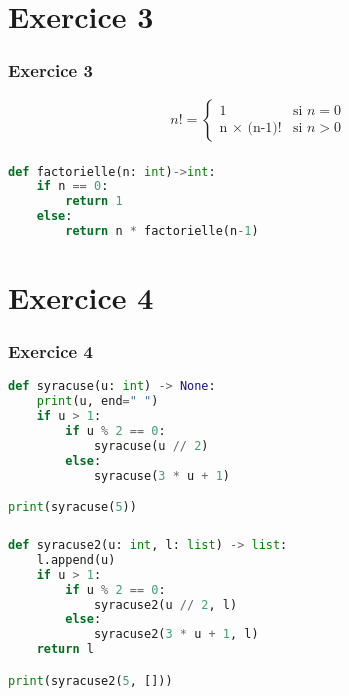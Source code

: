 \documentclass[svgnames,11pt]{beamer}
\begin{document}
\section{Exercice 3}
\begin{frame}
    \frametitle{Exercice 3}
    $$
    n! = \left\{
        \begin{array}{ll}
            1 & \mbox{si  }n=0\\
            \mbox{n × (n-1)!} & \mbox{si }n>0\
        \end{array}
    \right.
    $$
    

\end{frame}
\begin{frame}[fragile]
    \frametitle{}

\begin{center}
\begin{lstlisting}[language=Python , basicstyle=\ttfamily\small, xleftmargin=1em, xrightmargin=1em]
def factorielle(n: int)->int:
    if n == 0:
        return 1
    else:
        return n * factorielle(n-1)
\end{lstlisting}
\end{center}

\end{frame}
\section{Exercice 4}
\begin{frame}[fragile]
    \frametitle{Exercice 4}

\begin{center}
\begin{lstlisting}[language=Python , basicstyle=\ttfamily\small, xleftmargin=2em, xrightmargin=2em]
def syracuse(u: int) -> None:
    print(u, end=" ")
    if u > 1:
        if u % 2 == 0:
            syracuse(u // 2)
        else:
            syracuse(3 * u + 1)

print(syracuse(5))
\end{lstlisting}
\end{center}

\end{frame}
\begin{frame}[fragile]
    \frametitle{}

\begin{center}
\begin{lstlisting}[language=Python , basicstyle=\ttfamily\small, xleftmargin=2em, xrightmargin=2em]
def syracuse2(u: int, l: list) -> list:
    l.append(u)
    if u > 1:
        if u % 2 == 0:
            syracuse2(u // 2, l)
        else:
            syracuse2(3 * u + 1, l)
    return l

print(syracuse2(5, []))
\end{lstlisting}
\label{CODE}
\end{center}
\end{frame}
\end{document}
